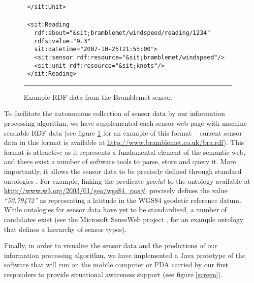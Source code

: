 \documentclass{acmtrans2m}
\begin{document}
\begin{figure}
\begin{minipage}{2.6in}
\begin{tabbing}
\tt\scriptsize \ </\color{magenta}sit:Unit\color{black}>\\
\\
\tt\scriptsize \ <\color{magenta}sit:Reading\color{black}\\
\tt\scriptsize \ \ \ rdf:about=\color{blue}"\&sit;bramblemet/windspeed/reading/1234"\color{black}\\
\tt\scriptsize \ \ \ rdfs:value=\color{blue}"9.3"\color{black}\\
\tt\scriptsize \ \ \ sit:datetime=\color{blue}"2007-10-25T21:55:00"\color{black}>\\
\tt\scriptsize \ \ \ <\color{magenta}sit:sensor\color{black}~rdf:resource=\color{blue}"\&sit;bramblemet/windspeed"\color{black}/>\\
\tt\scriptsize \ \ \ <\color{magenta}sit:unit\color{black}~rdf:resource=\color{blue}"\&sit;knots"\color{black}/>\\
\tt\scriptsize \ </\color{magenta}sit:Reading\color{black}>\\
\normalsize
\end{tabbing}
\end{minipage}\par
\rule{3.3in}{.005in} 
\caption{Example RDF data from the Bramblemet sensor.}
\label{rdf}
\end{figure}

To facilitate the autonomous collection of sensor data by our information processing algorithm, we have supplemented each sensor web page with machine readable RDF data (see figure \ref{rdf} for an example of this format -- current sensor data in this format is available at \small\url{http://www.bramblemet.co.uk/bra.rdf}\normalsize). This format is attractive as it represents a fundamental element of the semantic web, and there exist a number of software tools to parse, store and query it. More importantly, it allows the sensor data to be precisely defined through standard ontologies \cite{rdf,semantic}. For example, linking the predicate {\em geo:lat} to the ontology available at \small\url{http://www.w3.org/2003/01/geo/wgs84_pos#}\normalsize ~precisely defines the value {\em ``50.79472''} as representing a latitude in the WGS84 geodetic reference datum. While ontologies for sensor data have yet to be standardised, a number of candidates exist (see the Microsoft SenseWeb project \cite{senseweb}, for an example ontology that defines a hierarchy of sensor types).

Finally, in order to visualise the sensor data and the predictions of our information processing algorithm, we have implemented a Java prototype of the software that will run on the mobile computer or PDA carried by our first responders to provide situational awareness support (see figure \ref{screen}). 
\end{document}
